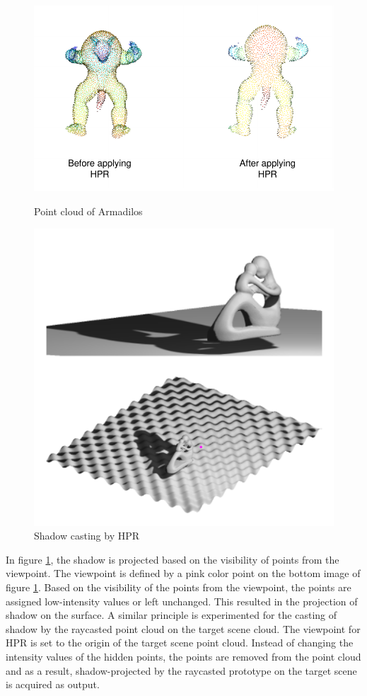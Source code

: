 \begin{figure}[htbp]
    \centering
    \begin{minipage}[b]{0.45\textwidth}
    \centering
    \includegraphics[width=0.5\linewidth]{97_graphics/concepts/shadowcasting_from_paper.pdf}
    \caption{Point cloud of Armadilos \parencite{open3d}}
    \label{fig:shadow_casting}
    \end{minipage}
    \hfill
    \begin{minipage}[b]{0.45\textwidth}
    \centering
    \includegraphics[width=0.5\linewidth]{97_graphics/concepts/hpr_reference_output.pdf}
    \caption{Shadow casting by HPR \parencite{katz2007}}
    \label{fig:hpr_reference_output}
    \end{minipage}
\end{figure}

In figure \ref{fig:hpr_reference_output}, the shadow is projected based on the visibility of points from the viewpoint. The viewpoint is defined by a pink color point on the bottom image of figure \ref{fig:hpr_reference_output}. Based on the visibility of the points from the viewpoint, the points are assigned low-intensity values or left unchanged. This resulted in the projection of shadow on the surface.
A similar principle is experimented for the casting of shadow by the raycasted point cloud on the target scene cloud. The viewpoint for HPR is set to the origin of the target scene point cloud. Instead of changing the intensity values of the hidden points, the points are removed from the point cloud and as a result, shadow-projected by the raycasted prototype on the target scene is acquired as output. 

